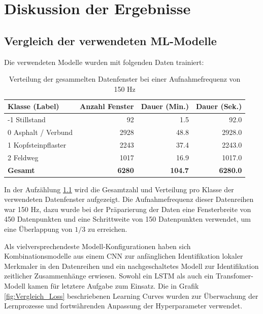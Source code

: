 \chapter{Diskussion der Ergebnisse}\label{ch:experiments}
\section{Vergleich der verwendeten ML-Modelle}
Die verwendeten Modelle wurden mit folgenden Daten trainiert:
\begin{table}[hbt!]
    \centering
    \begin{tabular}{lrrr}
        \hline
        \textbf{Klasse (Label)} & \textbf{Anzahl Fenster} & \textbf{Dauer (Min.)} & \textbf{Dauer (Sek.)} \\
        \hline
        -1 Stillstand & 92 & 1.5 & 92.0 \\
        0 Asphalt / Verbund & 2928 & 48.8 & 2928.0 \\
        1 Kopfsteinpflaster & 2243 & 37.4 & 2243.0 \\
        2 Feldweg & 1017 & 16.9 & 1017.0 \\
        \hline
        \textbf{Gesamt} & \textbf{6280} & \textbf{104.7} & \textbf{6280.0} \\
        \hline
    \end{tabular}
    \caption{Verteilung der gesammelten Datenfenster bei einer Aufnahmefrequenz von 150 Hz}
    \label{tab:label_distribution}
\end{table}

In der Aufzählung \ref{tab:label_distribution} wird die Gesamtzahl und Verteilung pro Klasse der verwendeten Datenfenster aufgezeigt. Die Aufnahmefrequenz dieser Datenreihen war 150 Hz, dazu wurde bei der Präparierung der Daten eine Fensterbreite von 450 Datenpunkten und eine Schrittweite von 150 Datenpunkten verwendet, um eine Überlappung von $1/3$ zu erreichen. 

Als vielversprechendeste Modell-Konfigurationen haben sich Kombinationsmodelle aus einem CNN zur anfänglichen Identifikation lokaler Merkmaler in den Datenreihen und ein nachgeschaltetes Modell zur Identifikation zeitlicher Zusammenhänge erwiesen. Sowohl ein LSTM als auch ein Transfomer-Modell kamen für letztere Aufgabe zum Einsatz. Die in Grafik \ref{fig:Vergleich_Loss} beschriebenen Learning Curves wurden zur Überwachung der Lernprozesse und fortwährenden Anpassung der Hyperparameter verwendet.

